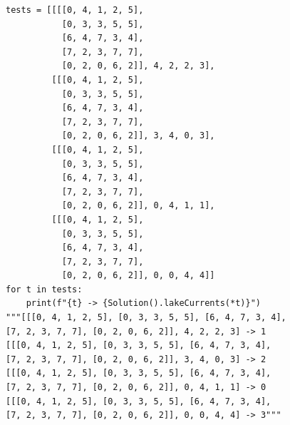 \documentclass[12pt]{article}
\begin{document}
\begin{verbatim}
tests = [[[[0, 4, 1, 2, 5],
           [0, 3, 3, 5, 5],
           [6, 4, 7, 3, 4],
           [7, 2, 3, 7, 7],
           [0, 2, 0, 6, 2]], 4, 2, 2, 3],
         [[[0, 4, 1, 2, 5],
           [0, 3, 3, 5, 5],
           [6, 4, 7, 3, 4],
           [7, 2, 3, 7, 7],
           [0, 2, 0, 6, 2]], 3, 4, 0, 3],
         [[[0, 4, 1, 2, 5],
           [0, 3, 3, 5, 5],
           [6, 4, 7, 3, 4],
           [7, 2, 3, 7, 7],
           [0, 2, 0, 6, 2]], 0, 4, 1, 1],
         [[[0, 4, 1, 2, 5],
           [0, 3, 3, 5, 5],
           [6, 4, 7, 3, 4],
           [7, 2, 3, 7, 7],
           [0, 2, 0, 6, 2]], 0, 0, 4, 4]]
for t in tests:
    print(f"{t} -> {Solution().lakeCurrents(*t)}")
"""[[[0, 4, 1, 2, 5], [0, 3, 3, 5, 5], [6, 4, 7, 3, 4],
[7, 2, 3, 7, 7], [0, 2, 0, 6, 2]], 4, 2, 2, 3] -> 1
[[[0, 4, 1, 2, 5], [0, 3, 3, 5, 5], [6, 4, 7, 3, 4],
[7, 2, 3, 7, 7], [0, 2, 0, 6, 2]], 3, 4, 0, 3] -> 2
[[[0, 4, 1, 2, 5], [0, 3, 3, 5, 5], [6, 4, 7, 3, 4],
[7, 2, 3, 7, 7], [0, 2, 0, 6, 2]], 0, 4, 1, 1] -> 0
[[[0, 4, 1, 2, 5], [0, 3, 3, 5, 5], [6, 4, 7, 3, 4],
[7, 2, 3, 7, 7], [0, 2, 0, 6, 2]], 0, 0, 4, 4] -> 3"""
\end{verbatim}
\end{document}
